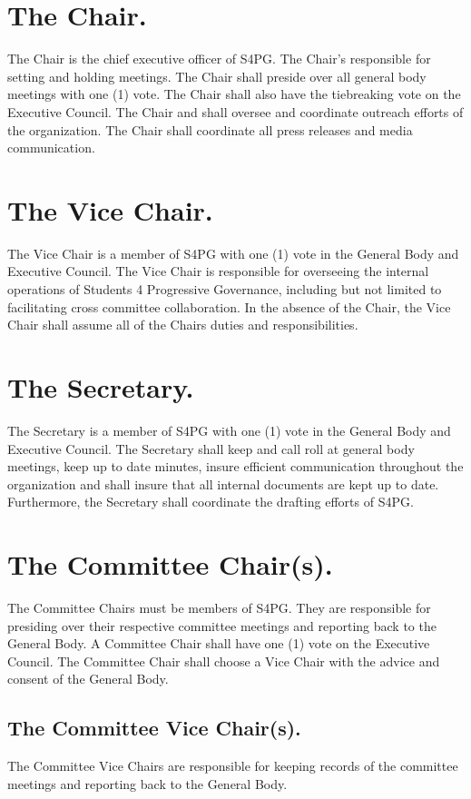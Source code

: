 \documentclass[12pt,letterpaper]{constitution}
\begin{document}
\section{The Chair.}
The Chair is the chief executive officer of S4PG.  The Chair’s responsible for setting and holding meetings.  The Chair shall preside over all general body meetings with one (1) vote.  The Chair shall also have the tiebreaking vote on the Executive Council.  The Chair and shall oversee and coordinate outreach efforts of the organization. The Chair shall coordinate all press releases and media communication.

\section{The Vice Chair.}
The Vice Chair is a member of S4PG with one (1) vote in the General Body and Executive Council. The Vice Chair is responsible for overseeing the internal operations of Students 4 Progressive Governance, including but not limited to facilitating cross committee collaboration.  In the absence of the Chair, the Vice Chair shall assume all of the Chairs duties and responsibilities.

\section{The Secretary.}
The Secretary is a member of S4PG with one (1) vote in the General Body and Executive Council.  The Secretary shall keep and call roll at general body meetings, keep up to date minutes, insure efficient communication throughout the organization and shall insure that all internal documents are kept up to date.  Furthermore, the Secretary shall coordinate the drafting efforts of S4PG.

\section{The Committee Chair(s).}
The Committee Chairs must be members of S4PG.  They are responsible for presiding over their respective committee meetings and reporting back to the General Body. A Committee Chair shall have one (1) vote on the Executive Council. The Committee Chair shall choose a Vice Chair with the advice and consent of the General Body.

\subsection{The Committee Vice Chair(s).}
The Committee Vice Chairs are responsible for keeping records of the committee meetings and reporting back to the General Body.
\end{document}
